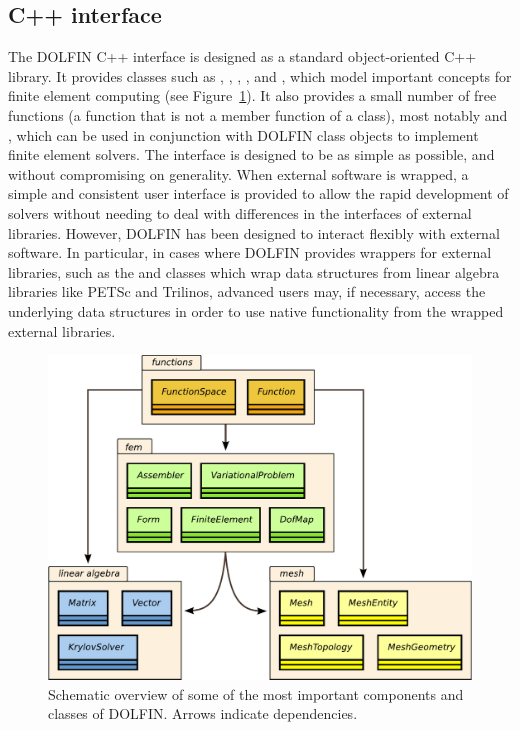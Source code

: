 \subsection{C++ interface}

The DOLFIN C++ interface is designed as a standard object-oriented
C++ library. It provides classes such as , ,
, ,  and ,
which model important concepts for finite element computing (see
Figure~\ref{fig:logg-2:uml}). It also provides a small number of free
functions (a function that is not a member function of a class),
most notably  and , which can be used in
conjunction with DOLFIN class objects to implement finite element
solvers. The interface is designed to be as simple as possible, and
without compromising on generality.  When external software is wrapped,
a simple and consistent user interface is provided to allow the rapid
development of solvers without needing to deal with differences in the
interfaces of external libraries. However, DOLFIN has been designed to
interact flexibly with external software. In particular, in cases where
DOLFIN provides wrappers for external libraries, such as the 
and  classes which wrap data structures from linear algebra
libraries like PETSc and Trilinos, advanced users may, if necessary,
access the underlying data structures in order to use native functionality
from the wrapped external libraries.

\begin{figure}
  \begin{center}
    \includegraphics[width=\largefig]{chapters/logg-2/pdf/dolfin-uml.pdf}
    \caption{Schematic overview of some of the most important components
    and classes of DOLFIN. Arrows indicate dependencies.}
    \label{fig:logg-2:uml}
  \end{center}
\end{figure}

